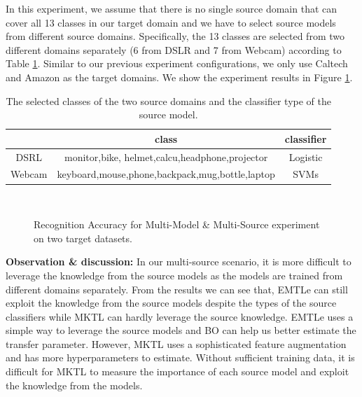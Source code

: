 In this experiment, we assume that there is no single source domain that can cover all 13 classes in our target domain and we have to select source models from different source domains. Specifically, the 13 classes are selected from two different domains separately (6 from DSLR and 7 from Webcam) according to Table \ref{tab:class_gen}. Similar to our previous experiment configurations, we only use Caltech and Amazon as the target domains. We show the experiment results in Figure \ref{fig:exp2}.
\begin{table}[htbp]
	\centering
	\caption{The selected classes of the two source domains and the classifier type of the source model.}
	\begin{tabular}{|c|c|c|}
		\hline
		& class & classifier\\
		\hline
		DSRL& monitor,bike, helmet,calcu,headphone,projector & Logistic\\\hline
		Webcam&keyboard,mouse,phone,backpack,mug,bottle,laptop&SVMs\\ \hline
		
	\end{tabular}%
	\label{tab:class_gen}%
\end{table}%
\begin{figure}[th]
	\centering
	\qquad\qquad
	\\
	\caption{Recognition Accuracy for Multi-Model \& Multi-Source experiment on two target datasets. }
	\label{fig:exp2}
\end{figure}

\textbf{Observation \& discussion:} In our multi-source scenario, it is more difficult to leverage the knowledge from the source models as the models are trained from different domains separately. From the results we can see that, EMTLe can still exploit the knowledge from the source models despite the types of the source classifiers while MKTL can hardly leverage the source knowledge. EMTLe uses a simple way to leverage the source models and BO can help us better estimate the transfer parameter. However, MKTL uses a sophisticated feature augmentation and has more hyperparameters to estimate. Without sufficient training data, it is difficult for MKTL to measure the importance of each source model and exploit the knowledge from the models.




